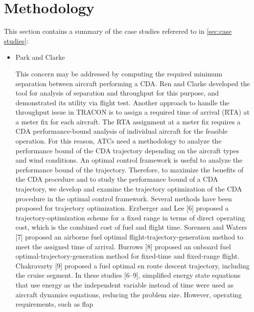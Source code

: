 \documentclass{aer1315-pretty}
\begin{document}
\section{Methodology} \label{sec:methodology}

This section contains a summary of the case studies referered to in \ref{sec:case studies}:

\begin{itemize}

\item Park and Clarke \cite{Park:2015} 

This concern may be addressed by computing the required minimum separation between aircraft performing a CDA. Ren and Clarke developed the tool for analysis of separation and throughput for this purpose, and demonstrated its utility via flight test. Another approach to handle the throughput issue in TRACON is to assign a required time of arrival (RTA) at a meter fix for each aircraft. The RTA assignment at a meter fix requires a CDA performance-bound analysis of individual aircraft for the feasible operation. For this reason, ATCs need a methodology to analyze the performance bound of the CDA trajectory depending on the aircraft types and wind conditions. An optimal control framework is useful to analyze the performance bound of the trajectory. Therefore, to maximize the benefits of the CDA procedure and to study the performance bound of a CDA trajectory, we develop and examine the trajectory optimization of the CDA procedure in the optimal control framework. Several methods have been proposed for trajectory optimization. Erzberger and Lee [6] proposed a trajectory-optimization scheme for a fixed range in terms of direct operating cost, which is the combined cost of fuel and flight time. Sorensen and Waters [7] proposed an airborne fuel optimal flight-trajectory-generation method to meet the assigned time of arrival. Burrows [8] proposed an onboard fuel optimal-trajectory-generation method for fixed-time and fixed-range flight. Chakravarty [9] proposed a fuel optimal en route descent trajectory, including the cruise segment. In these studies [6–9], simplified energy state equations that use energy as the independent variable instead of time were used as aircraft dynamics equations, reducing the problem size. However, operating requirements, such as flap

\end{itemize}
\end{document}
